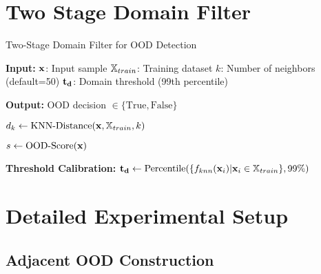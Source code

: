 \section{Two Stage Domain Filter}

\label{app:twostageapp}

\begin{algorithm}[H]
\caption{Two-Stage Domain Filter for OOD Detection}
\label{app:twostage}
\begin{algorithmic}[1]
\State \textbf{Input:}
    \State ${\mathbf{x}}$: Input sample
    \State ${\mathbb{X}}_{train}$: Training dataset
    \State $k$: Number of neighbors (default=50)
    \State ${\mathbf{t}}_{\mathbf{d}}$: Domain threshold (99th percentile)

\State \textbf{Output:}
    \State OOD decision $\in \{\text{True}, \text{False}\}$

    \State $d_k \gets \text{KNN-Distance}({\mathbf{x}}, {\mathbb{X}}_{train}, k)$ 
        \State \Return {} 
    \Else
        \State \Return {} 
    \EndIf
\EndProcedure

    \State {}
        \State \Return {} 
    \EndIf

    \State {}
    \State $s \gets \text{OOD-Score}({\mathbf{x}})$ 
     
        \State \Return {}
    \Else
        \State \Return {}
    \EndIf
\EndProcedure

\State \textbf{Threshold Calibration:}
\State ${\mathbf{t}}_{\mathbf{d}} \gets \text{Percentile}(\{f_{knn}({\mathbf{x}}_i) | {\mathbf{x}}_i \in {\mathbb{X}}_{train}\}, 99\%)$

\end{algorithmic}
\end{algorithm}

\section{Detailed Experimental Setup}

\label{app:setup}

\subsection{Adjacent OOD Construction}

